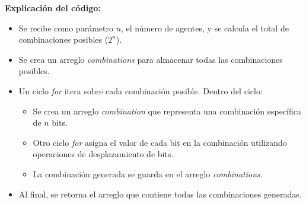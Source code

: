 \documentclass[letterpaper,10pt]{article}
\begin{document}
\textbf{Explicación del código:}
\begin{itemize}
  \item Se recibe como parámetro \(n\), el número de agentes, y se calcula el total de combinaciones posibles (\(2^n\)).
  \item Se crea un arreglo \textit{combinations} para almacenar todas las combinaciones posibles.
  \item Un ciclo \textit{for} itera sobre cada combinación posible. Dentro del ciclo:
  \begin{itemize}
    \item Se crea un arreglo \textit{combination} que representa una combinación específica de \(n\) bits.
    \item Otro ciclo \textit{for} asigna el valor de cada bit en la combinación utilizando operaciones de desplazamiento de bits.
    \item La combinación generada se guarda en el arreglo \textit{combinations}.
  \end{itemize}
  \item Al final, se retorna el arreglo que contiene todas las combinaciones generadas.
\end{itemize}
\end{document}
